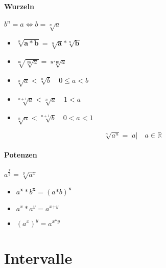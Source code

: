 \paragraph{Wurzeln} $b^n = a \Leftrightarrow b = \sqrt[n]{a}$

\begin{itemize}
  \item $\sqrt[n]{\mathbf{a * b}} = \sqrt[n]{\mathbf{a}} \mathbin{\boldsymbol{*}} \sqrt[n]{\mathbf{b}}$

  \item $\sqrt[\mathbf{n}]{ \sqrt[\mathbf{m}]{a} } = \sqrt[\mathbf{n * m}]{a}$

  \item $\sqrt[n]{a} < \sqrt[n]{b} \quad 0 \leq a < b$

  \item $\sqrt[n+1]{a} < \sqrt[n]{a} \quad 1 < a$

  \item $\sqrt[n]{a} < \sqrt[n+1]{b} \quad 0 < a < 1$
\end{itemize}

$$\sqrt[n]{a^n} = |a| \quad a \in \mathbb{R}$$

\paragraph{Potenzen} $a^{\frac{x}{y}} = \sqrt[y]{a^x}$

\begin{itemize}
  \item $a^{\mathbf{x}} * b^{\mathbf{x}} = (a \mathbf{*} b)^{\mathbf{x}}$

  \item $a^x * a^y = a^{x \boldsymbol{+} y}$

  \item $(a^x)^y = a^{x \boldsymbol{*} y}$

\end{itemize}

\section{Intervalle}

